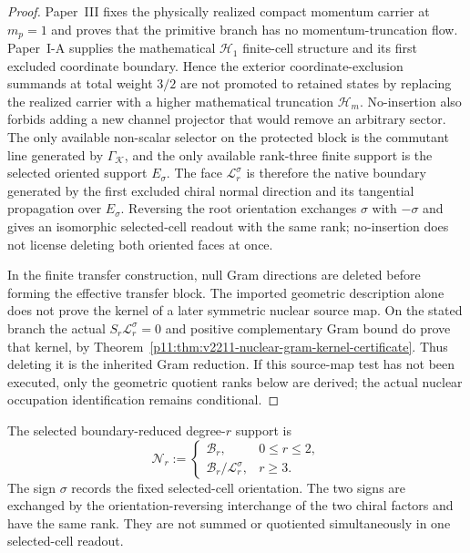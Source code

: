 \documentclass[12pt,a4paper]{article}
\begin{document}
\begin{proof}
Paper~III fixes the physically realized compact momentum carrier at \(m_p=1\) and proves that the primitive branch has no momentum-truncation flow.  Paper~I-A supplies the mathematical \(\mathcal H_1\) finite-cell structure and its first excluded coordinate boundary.  Hence the exterior coordinate-exclusion summands at total weight \(3/2\) are not promoted to retained states by replacing the realized carrier with a higher mathematical truncation \(\mathcal H_m\).  No-insertion also forbids adding a new channel projector that would remove an arbitrary sector.  The only available non-scalar selector on the protected block is the commutant line generated by \(\Gamma_{\mathcal K}\), and the only available rank-three finite support is the selected oriented support \(E_\sigma\).  The face \(\mathcal L_r^\sigma\) is therefore the native boundary generated by the first excluded chiral normal direction and its tangential propagation over \(E_\sigma\).  Reversing the root orientation exchanges \(\sigma\) with \(-\sigma\) and gives an isomorphic selected-cell readout with the same rank; no-insertion does not license deleting both oriented faces at once.

In the finite transfer construction, null Gram directions are deleted before forming the effective transfer block.  The imported geometric description alone does not prove the kernel of
a later symmetric nuclear source map. On the stated branch the actual
$S_r\mathcal L_r^\sigma=0$ and positive complementary Gram bound do prove
that kernel, by Theorem~\ref{p11:thm:v2211-nuclear-gram-kernel-certificate}.
Thus deleting it is the inherited Gram reduction. If this source-map test
has not been executed, only the geometric quotient ranks below are derived;
the actual nuclear occupation identification remains conditional.
\end{proof}

\begin{definition}
\label{p11:def:boundary-reduced-finite-shell-support}
The selected boundary-reduced degree-\(r\) support is
\[
        \mathcal N_r
        :=
        \begin{cases}
        \mathcal B_r, & 0\leq r\leq2,\\[3pt]
        \mathcal B_r/\mathcal L_r^\sigma, & r\geq3.
        \end{cases}
\]
The sign \(\sigma\) records the fixed selected-cell orientation.  The two signs are exchanged by the orientation-reversing interchange of the two chiral factors and have the same rank.  They are not summed or quotiented simultaneously in one selected-cell readout.
\end{definition}
\end{document}
